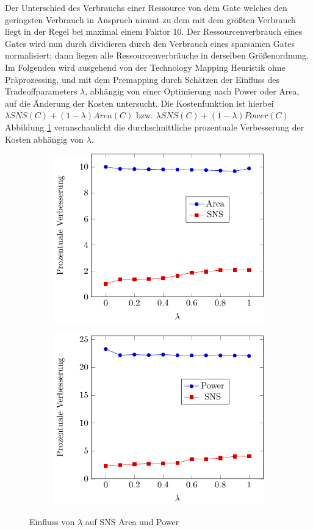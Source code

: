 \documentclass[11pt, a4paper, german]{article}
\newcommand{\TM}{Technology  Mapping }
\begin{document}
Der Unterschied des Verbrauchs einer Ressource von dem Gate welches den geringsten Verbrauch in Anspruch nimmt zu dem mit dem gr\"o{\ss}ten Verbrauch liegt in der Regel bei maximal einem Faktor 10. Der Ressourcenverbrauch eines Gates wird nun durch dividieren durch den Verbrauch eines sparsamen Gates normalisiert; dann liegen alle Ressourcenverbräuche  in derselben Gr\"o{\ss}enordnung. \\
Im Folgenden wird ausgehend von der \TM Heuristik ohne Präprozessing, und mit dem Premapping durch Sch\"atzen der Einfluss des Tradeoffparameters $\lambda$, abhängig von einer Optimierung nach Power oder Area,  auf die Änderung der Kosten untersucht.  Die Kostenfunktion ist hierbei $\lambda SNS(C) + (1-\lambda)Area(C)$ bzw. $\lambda SNS(C) + (1-\lambda)Power(C)$\\
Abbildung \ref{bild:area_slack_tradeoff} veranschaulicht die durchschnittliche prozentuale Verbesserung der Kosten abhängig von $\lambda$.\\
	\begin{figure}[h]
\centering
\begin{subfigure}{.5\textwidth}
  \centering
  \includegraphics[width=.8\linewidth]{pictures/tex_files/analysis/tradeoff_curve}
\end{subfigure}%
\begin{subfigure}{.5\textwidth}
  \centering
  \includegraphics[width=.8\linewidth]{pictures/tex_files/analysis/tradeoff_curve_vt}
\end{subfigure}
\caption{Einfluss von $\lambda$ auf SNS Area und Power}
\label{bild:area_slack_tradeoff}
\end{figure}
\end{document}
